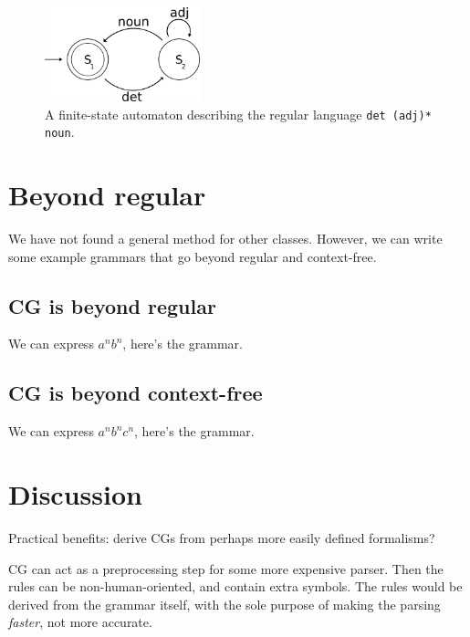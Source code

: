 \documentclass[11pt]{article}
\def\t#1{\texttt{#1}}
\begin{document}



\begin{figure}[t]
  \centering
    \includegraphics[width=0.4\textwidth]{fsa.png}
  \caption{A finite-state automaton describing the regular language \t{det (adj)* noun}.}
 \label{fig:fsa}
\end{figure}


\section{Beyond regular}

We have not found a general method for other classes. 
However, we can write some example grammars that go beyond regular and context-free.

\subsection{CG is beyond regular}

We can express $a^nb^n$, here's the grammar.

\subsection{CG is beyond context-free}

We can express $a^nb^nc^n$, here's the grammar.  

\section{Discussion}

Practical benefits: derive CGs from perhaps more easily defined formalisms?

CG can act as a preprocessing step for some more expensive parser. Then the rules can be non-human-oriented, and contain extra symbols. The rules would be derived from the grammar itself, with the sole purpose of making the parsing \emph{faster}, not more accurate.









\end{document}
